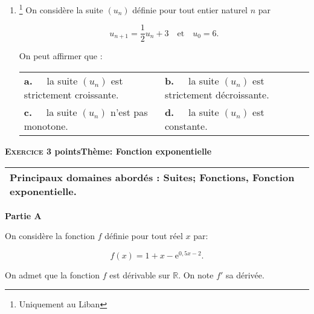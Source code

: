 \documentclass[11pt,a4paper,french]{article}
\newcommand{\R}{\mathbb{R}}
\begin{document}
\begin{enumerate}[resume]
\item \footnote{Uniquement au Liban} On considère la suite $\left(u_n\right)$ définie pour tout entier naturel $n$ par 

\[u_{n+1} = \dfrac12u_n + 3\quad \text{et}\quad u_0 = 6.\]

On peut affirmer que :

\begin{center}
\begin{tabularx}{\linewidth}{*{2}{X}}
\textbf{a.~~} la suite $\left(u_n\right)$ est strictement croissante.&\textbf{b.~~} la suite $\left(u_n\right)$ est strictement décroissante.\\
\textbf{c.~~} la suite $\left(u_n\right)$ n'est pas monotone. &\textbf{d.~~} la suite $\left(u_n\right)$ est constante.
\end{tabularx}
\end{center}
\end{enumerate}

\bigskip

\textbf{\textsc{Exercice 3}  points\hfill Thème: Fonction exponentielle }

\medskip

\begin{tabularx}{\linewidth}{|X|}\hline
\textbf{Principaux domaines abordés :} Suites;
Fonctions, Fonction exponentielle.\\ \hline
\end{tabularx}

\bigskip

\textbf{Partie A}

\medskip

On considère la fonction $f$ définie pour tout réel $x$ par:

\[ f(x) = 1+x - \text{e}^{0,5x - 2}.\]

On admet que la fonction $f$ est dérivable sur $\R$. On note $f'$ sa dérivée.

\medskip
\end{document}
